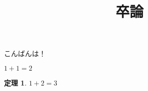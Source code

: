 \documentclass{jsarticle}
\title{卒論}
\theoremstyle{definition}
\newtheorem{theorem}{定理}
\begin{document}
\maketitle
こんばんは！

$1 + 1 = 2$

\begin{theorem}
 $ 1 + 2 = 3$
\end{theorem}
\end{document}
